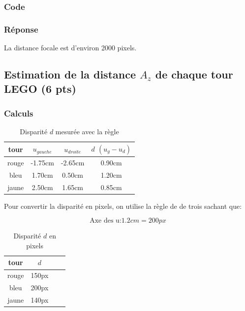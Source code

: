 \documentclass[12pt]{article}
\begin{document}
\subsubsection{Code}
\subsubsection{Réponse}
La distance focale est d'environ 2000 pixels.

\subsection{Estimation de la distance $A_z$ de chaque tour LEGO (6 pts)}
\label{estimation_distance_Az}
\subsubsection{Calculs}

\begin{table}[h]
\caption{Disparit\'e $d$ mesur\'ee avec la r\`egle}
\label{TableCoord}
\begin{center}
\begin{tabular}{|c|c|c|c|}
\hline
    tour   &  $u_{gauche}$  &  $u_{droite}$  &  $d$ $(u_g - u_d)$ \\
\hline
    rouge  & -1.75cm & -2.65cm & 0.90cm \\
    bleu   & 1.70cm & 0.50cm & 1.20cm \\
    jaune  & 2.50cm & 1.65cm & 0.85cm \\
\hline
\end{tabular}
\end{center}
\end{table}

Pour convertir la disparit\'e en pixels, on utilise la r\`egle de de trois sachant que:

\[ \text{Axe des u:} 1.2cm = 200px \]


\begin{table}[h]
\caption{Disparit\'e $d$ en pixels}
\label{TableCoord}
\begin{center}
\begin{tabular}{|c|c|c|c|}
\hline
    tour   &  $d$ \\
\hline
    rouge  &  150px \\
    bleu   &  200px \\
    jaune  &  140px \\
\hline
\end{tabular}
\end{center}
\end{table}
\end{document}
